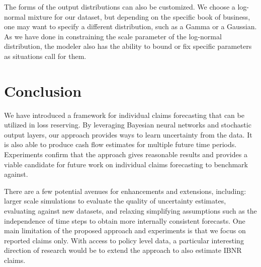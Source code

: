 \documentclass{article}
\begin{document}
The forms of the output distributions can also be customized. We choose a log-normal mixture for our dataset, but depending on the specific book of business, one may want to specify a different distribution, such as a Gamma or a Gaussian. As we have done in constraining the scale parameter of the log-normal distribution, the modeler also has the ability to bound or fix specific parameters as situations call for them.

\section{Conclusion}

We have introduced a framework for individual claims forecasting that can be utilized in loss reserving. By leveraging Bayesian neural networks and stochastic output layers, our approach provides ways to learn uncertainty from the data. It is also able to produce cash flow estimates for multiple future time periods. Experiments confirm that the approach gives reasonable results and provides a viable candidate for future work on individual claims forecasting to benchmark against.

There are a few potential avenues for enhancements and extensions, including: larger scale simulations to evaluate the quality of uncertainty estimates, evaluating against new datasets, and relaxing simplifying assumptions such as the independence of time steps to obtain more internally consistent forecasts. One main limitation of the proposed approach and experiments is that we focus on reported claims only. With access to policy level data, a particular interesting direction of research would be to extend the approach to also estimate IBNR claims.

  




\end{document}
